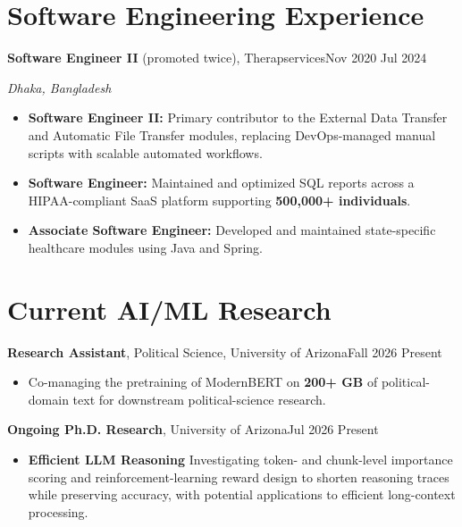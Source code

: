 \documentclass[11pt]{extarticle}
\newcommand{\entryheading}[2]{%
  {\normalsize #1}\hfill{\small #2}\par
}
\newcommand{\entrydetail}[1]{{\small #1}\par}
\begin{document}
\section*{Software Engineering Experience}
\entryheading{\textbf{Software Engineer II} (promoted twice), Therapservices}{Nov 2020 \textendash{} Jul 2024}
\entrydetail{\textit{Dhaka, Bangladesh}}
\begin{itemize}
  \item {\small \textbf{Software Engineer II:} Primary contributor to the External Data Transfer and Automatic File Transfer modules, replacing DevOps-managed manual scripts with scalable automated workflows.}
  \item {\small \textbf{Software Engineer:} Maintained and optimized SQL reports across a HIPAA-compliant SaaS platform supporting \textbf{500,000+ individuals}.}
  \item {\small \textbf{Associate Software Engineer:} Developed and maintained state-specific healthcare modules using Java and Spring.}
\end{itemize}

\section*{Current AI/ML Research}
\entryheading{\textbf{Research Assistant}, Political Science, University of Arizona}{Fall 2026 \textendash{} Present}
\begin{itemize}
  \item {\small Co-managing the pretraining of ModernBERT on \textbf{200+ GB} of political-domain text for downstream political-science research.}
\end{itemize}

\entryheading{\textbf{Ongoing Ph.D. Research}, University of Arizona}{Jul 2026 \textendash{} Present}
\begin{itemize}
  \item {\normalsize\bfseries Efficient LLM Reasoning} {\small Investigating token- and chunk-level importance scoring and reinforcement-learning reward design to shorten reasoning traces while preserving accuracy, with potential applications to efficient long-context processing.}
\end{itemize}
\end{document}
